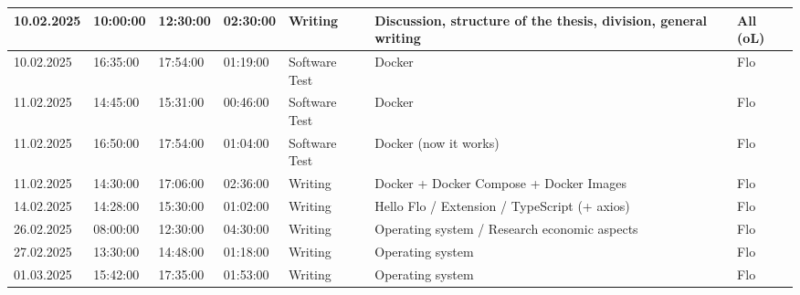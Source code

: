 \begin{longtable}{@{}p{1.8cm} p{1.2cm} p{1.2cm} p{1.2cm} p{2cm} p{4.5cm} p{2cm}@{}}
    \hline
    10.02.2025 & 10:00:00 & 12:30:00 & 02:30:00 & Writing & Discussion, structure of the thesis, division, general writing & All (oL) \\
    \hline
    10.02.2025 & 16:35:00 & 17:54:00 & 01:19:00 & Software Test & Docker & Flo \\
    \hline
    11.02.2025 & 14:45:00 & 15:31:00 & 00:46:00 & Software Test & Docker & Flo \\
    \hline
    11.02.2025 & 16:50:00 & 17:54:00 & 01:04:00 & Software Test & Docker (now it works) & Flo \\
    \hline
    11.02.2025 & 14:30:00 & 17:06:00 & 02:36:00 & Writing & Docker + Docker Compose + Docker Images & Flo \\
    \hline
    14.02.2025 & 14:28:00 & 15:30:00 & 01:02:00 & Writing & Hello Flo / Extension / TypeScript (+ axios) & Flo \\
    \hline
    26.02.2025 & 08:00:00 & 12:30:00 & 04:30:00 & Writing & Operating system / Research economic aspects & Flo \\
    \hline
    27.02.2025 & 13:30:00 & 14:48:00 & 01:18:00 & Writing & Operating system & Flo \\
    \hline
    01.03.2025 & 15:42:00 & 17:35:00 & 01:53:00 & Writing & Operating system & Flo \\
    \hline
    

\end{longtable}
